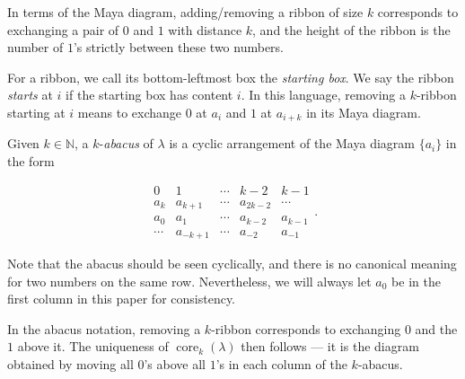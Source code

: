 \documentclass[pdflatex,sn-mathphys-num]{sn-jnl}%
\theoremstyle{thmstyleone}%
\theoremstyle{thmstyletwo}%
\theoremstyle{thmstylethree}%
\numberwithin{equation}{section}
\newcommand{\N}{\mathbb{N}}
\DeclareMathOperator{\core}{core}
\begin{document}
	In terms of the Maya diagram, adding/removing a ribbon of size $k$ corresponds to exchanging a pair of $0$ and $1$ with distance $k$, and the height of the ribbon is the number of $1$'s strictly between these two numbers.
	
	For a ribbon, we call its bottom-leftmost box the \emph{starting box}. We say the ribbon \emph{starts} at $i$ if the starting box has content $i$. In this language, removing a $k$-ribbon starting at $i$ means to exchange $0$ at $a_i$ and $1$ at $a_{i+k}$ in its Maya diagram.
	
	Given $k\in \N$, a $k$-\emph{abacus} of $\lambda$ is a cyclic arrangement of the Maya diagram $\{a_i\}$ in the form
	
	\[\begin{array}{ccccc}
		0&1&\cdots &k-2&k-1\\
		\hline\hline
		a_k & a_{k+1} & \cdots & a_{2k-2}& \cdots\\
		a_{0}&a_{1}&\cdots& a_{k-2}&a_{k-1}\\
		\cdots&a_{-k+1}&\cdots&a_{-2}&a_{-1}
	\end{array}.\]
    
	Note that the abacus should be seen cyclically, and there is no canonical meaning for two numbers on the same row. Nevertheless, we will always let $a_0$ be in the first column in this paper for consistency.

    In the abacus notation, removing a $k$-ribbon corresponds to exchanging $0$ and the $1$ above it. The uniqueness of $\core_k(\lambda)$ then follows --- it is the diagram obtained by moving all $0$'s above all $1$'s in each column of the $k$-abacus.
	
\end{document}
